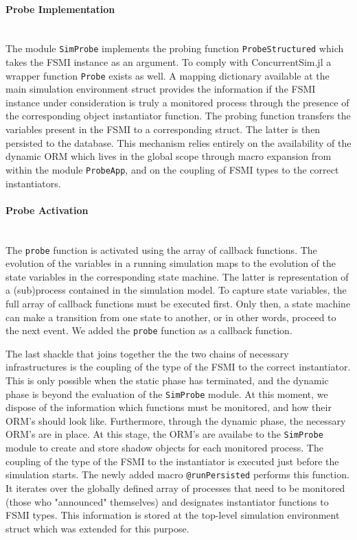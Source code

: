 \documentclass{juliacon}
\begin{document}
\paragraph{Probe Implementation}\hfill\\

The module \texttt{SimProbe} implements the probing function \texttt{ProbeStructured} which takes the FSMI instance as an argument. To comply with ConcurrentSim.jl a wrapper function \texttt{Probe} exists as well. A mapping dictionary available at the main simulation environment struct provides the information if the FSMI instance under consideration is truly a monitored process through the presence of the corresponding object instantiator function. The probing function transfers the variables present in the FSMI to a corresponding struct. The latter is then persisted to the database. This mechanism relies entirely on the availability of the dynamic ORM which lives in the global scope through macro expansion from within the module \texttt{ProbeApp}, and on the coupling of FSMI types to the correct instantiators.\vskip 6pt

\paragraph{Probe Activation}\hfill\\
The \texttt{probe} function is activated using the array of callback functions. The evolution of the variables in a running simulation maps to the evolution of the state variables in the corresponding state machine. The latter is representation of a (sub)process contained in the simulation model. To capture state variables, the full array of callback functions must be executed first. Only then, a state machine can make a transition from one state to another, or in other words, proceed to the next event. We added the \texttt{probe} function as a callback function.\vskip 6pt

The last shackle that joins together the the two chains of necessary infrastructures is the coupling of the type of the FSMI to the correct instantiator. This is only possible when the static phase has terminated, and the dynamic phase is beyond the evaluation of the \texttt{SimProbe} module. At this moment, we dispose of the information which functions must be monitored, and how their ORM's should look like. Furthermore, through the dynamic phase, the necessary ORM's are in place. At this stage, the ORM's are availabe to the \texttt{SimProbe} module to create and store shadow objects for each monitored process. The coupling of the type of the FSMI to the instantiator is executed just before the simulation starts. The newly added macro \texttt{@runPersisted} performs this function. It iterates over the globally defined array of processes that need to be monitored (those who "announced" themselves) and designates instantiator functions to FSMI types. This information is stored at the top-level simulation environment struct which was extended for this purpose.\vskip 6pt
\end{document}
